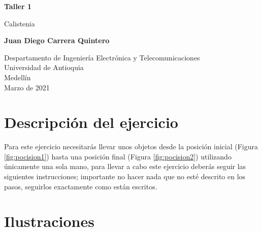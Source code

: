 \documentclass{article}
\begin{document}
\begin{titlepage}
    \begin{center}
        \vspace*{1cm}
            
        \Huge
        \textbf{Taller 1}
            
        \vspace{0.5cm}
        \LARGE
        Calistenia
            
        \vspace{1.5cm}
            
        \textbf{Juan Diego Carrera Quintero}
            
        \vfill
            
        \vspace{0.8cm}
            
        \Large
        Despartamento de Ingeniería Electrónica y Telecomunicaciones\\
        Universidad de Antioquia\\
        Medellín\\
        Marzo de 2021
            
    \end{center}
\end{titlepage}

\tableofcontents
\newpage
\section{Descripción del ejercicio}\label{intro}
Para este ejercicio necesitarás llevar unos objetos desde la posición inicial (Figura \ref{fig:pocision1}) hasta una posición final (Figura \ref{fig:pocision2}) utilizando únicamente una sola mano, para llevar a cabo este ejercicio deberás seguir las siguientes instrucciones; importante no hacer nada que no esté descrito en los pasos, seguirlos exactamente como están escritos.

\section{Ilustraciones}\label{imagenes}
\end{document}
